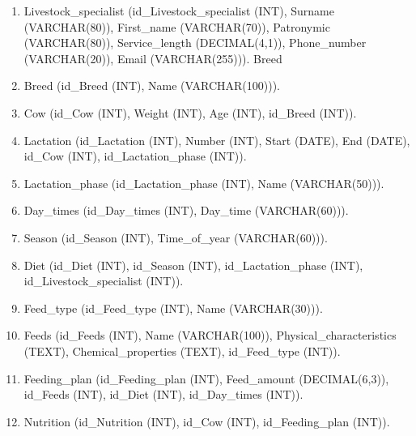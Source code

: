 \begin{enumerate}
    \item Livestock\_specialist (id\_Livestock\_specialist (INT), Surname (VARCHAR(80)), First\_name (VARCHAR(70)), Patronymic (VARCHAR(80)), Service\_length (DECIMAL(4,1)), Phone\_number (VARCHAR(20)), Email (VARCHAR(255))).
Breed     \item Breed (id\_Breed (INT), Name (VARCHAR(100))).
    \item Cow (id\_Cow (INT), Weight (INT), Age (INT), id\_Breed (INT)).
    \item Lactation (id\_Lactation (INT), Number (INT), Start (DATE), End (DATE), id\_Cow (INT), id\_Lactation\_phase (INT)).
    \item Lactation\_phase (id\_Lactation\_phase (INT), Name (VARCHAR(50))).
    \item Day\_times (id\_Day\_times (INT), Day\_time (VARCHAR(60))).
    \item Season (id\_Season (INT), Time\_of\_year (VARCHAR(60))).
    \item Diet (id\_Diet (INT), id\_Season (INT), id\_Lactation\_phase (INT), id\_Livestock\_specialist (INT)).
    \item Feed\_type (id\_Feed\_type (INT), Name (VARCHAR(30))).
    \item Feeds (id\_Feeds (INT), Name (VARCHAR(100)), Physical\_characteristics (TEXT), Chemical\_properties (TEXT), id\_Feed\_type (INT)).
    \item Feeding\_plan (id\_Feeding\_plan (INT), Feed\_amount (DECIMAL(6,3)), id\_Feeds (INT), id\_Diet (INT), id\_Day\_times (INT)).
    \item Nutrition (id\_Nutrition (INT), id\_Cow (INT), id\_Feeding\_plan (INT)).
\end{enumerate}

